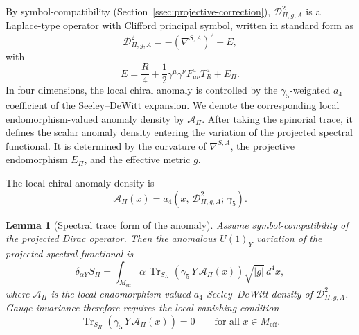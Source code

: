 \documentclass[11pt,a4paper]{article}
\newtheorem{lemma}[theorem]{Lemma}
\theoremstyle{definition}
\theoremstyle{remark}
\begin{document}
    By symbol-compatibility (Section~\ref{ssec:projective-correction}),
    $\mathcal{D}_{\Pi,g,A}^2$ is a Laplace-type operator with Clifford principal symbol,
    written in standard form as
    \begin{equation}
      \label{eq:laplace-form}
      \mathcal{D}_{\Pi,g,A}^2 = -(\nabla^{S,A})^2 + E,
    \end{equation}
    with
    \begin{equation}
      \label{eq:endomorphism-E}
      E = \frac{R}{4} + \frac{1}{2}\gamma^\mu\gamma^\nu F^a_{\mu\nu} T^a_R + E_\Pi .
    \end{equation}
    In four dimensions, the local chiral anomaly is controlled by the
    $\gamma_5$-weighted $a_4$ coefficient of the Seeley--DeWitt expansion.
    We denote the corresponding local endomorphism-valued anomaly density by
    $\mathcal{A}_\Pi$.
    After taking the spinorial trace, it defines the scalar anomaly density entering
    the variation of the projected spectral functional.
    It is determined by the curvature of $\nabla^{S,A}$, the projective endomorphism
    $E_\Pi$, and the effective metric $g$.

    The local chiral anomaly density is
    \begin{equation}
      \label{eq:anomaly-density-a4}
      \mathcal{A}_\Pi(x) = a_4\!\left(x,\, \mathcal{D}_{\Pi,g,A}^2;\, \gamma_5\right).
    \end{equation}

    \begin{lemma}[Spectral trace form of the anomaly]
      \label{lem:spectral-anomaly-trace}
      Assume symbol-compatibility of the projected Dirac operator.
      Then the anomalous $U(1)_Y$ variation of the projected spectral functional is
      \begin{equation}
        \label{eq:anomaly-trace}
        \delta_{\alpha Y} S_\Pi
        =
        \int_{M_{\mathrm{eff}}}
        \alpha \,
        \operatorname{Tr}_{S_\Pi}\!\left(
                                     \gamma_5 \, Y \, \mathcal{A}_\Pi(x)
        \right)
        \sqrt{|g|} \, d^4x ,
      \end{equation}
      where $\mathcal{A}_\Pi$ is the local endomorphism-valued $a_4$ Seeley--DeWitt
      density of $\mathcal{D}_{\Pi,g,A}^2$.
      Gauge invariance therefore requires the local vanishing condition
      \begin{equation}
        \label{eq:anomaly-vanishing}
        \operatorname{Tr}_{S_\Pi}\!\left(
                                     \gamma_5 \, Y \, \mathcal{A}_\Pi(x)
        \right) = 0
        \qquad
        \text{for all } x \in M_{\mathrm{eff}} .
      \end{equation}
    \end{lemma}
\end{document}
